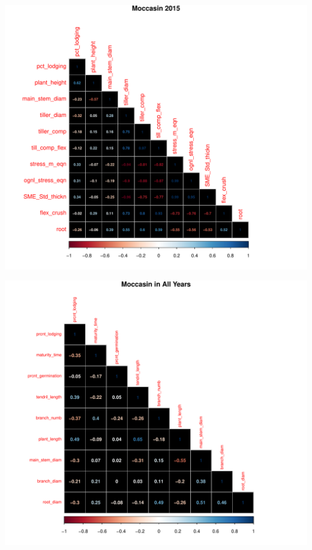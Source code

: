 \documentclass[11pt]{article}\usepackage[]{graphicx}\usepackage[]{color}
\makeatletter
\def\maxwidth{ %
  \ifdim\Gin@nat@width>\linewidth
    \linewidth
  \else
    \Gin@nat@width
  \fi
}
\newenvironment{knitrout}{}{} %
\makeatother
\begin{document}
\begin{knitrout}\footnotesize
{}\color{fgcolor}

{\centering \includegraphics[width=\maxwidth]{figure/Moc15-1} 

}




{\centering \includegraphics[width=\maxwidth]{figure/Moc15-2} 

}



\end{knitrout}
\pagebreak
\end{document}
